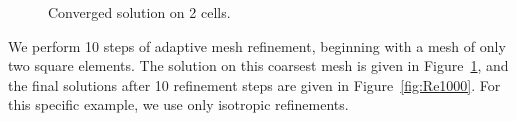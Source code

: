 \begin{figure}
\centering
{}
\caption{Converged solution on 2 cells.}
\label{fig:Re1000_2cells}
\end{figure}

We perform 10 steps of adaptive mesh refinement, beginning with a mesh of only two square elements.  The solution on this coarsest mesh is given in Figure~\ref{fig:Re1000_2cells}, and the final solutions after 10 refinement steps are given in Figure~\ref{fig:Re1000}.  For this specific example, we use only isotropic refinements.  


